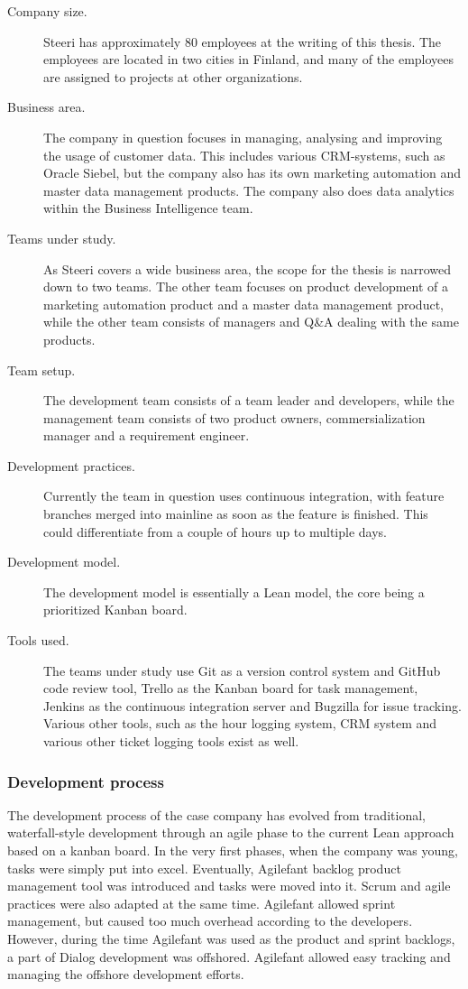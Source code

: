 \documentclass[english]{tktltiki2}
\theoremstyle{definition}
\theoremstyle{remark}
\begin{document}
\begin{description}
  \item[Company size.] Steeri has approximately 80 employees at the writing of this thesis. The employees are located in two cities in Finland, and many of the employees are assigned to projects at other organizations.
  \item[Business area.] The company in question focuses in managing, analysing and improving the usage of customer data. This includes various CRM-systems, such as Oracle Siebel, but the company also has its own marketing automation and master data management products. The company also does data analytics within the Business Intelligence team.
  \item[Teams under study.] As Steeri covers a wide business area, the scope for the thesis is narrowed down to two teams. The other team focuses on product development of a marketing automation product and a master data management product, while the other team consists of managers and Q\&A dealing with the same products.
  \item[Team setup.] The development team consists of a team leader and developers, while the management team consists of two product owners, commersialization manager and a requirement engineer. 
  \item[Development practices.] Currently the team in question uses continuous integration, with feature branches merged into mainline as soon as the feature is finished. This could differentiate from a couple of hours up to multiple days.
  \item[Development model.] The development model is essentially a Lean model, the core being a prioritized Kanban board.  
  \item[Tools used.] The teams under study use Git as a version control system and GitHub code review tool, Trello as the Kanban board for task management, Jenkins as the continuous integration server and Bugzilla for issue tracking. Various other tools, such as the hour logging system, CRM system and various other ticket logging tools exist as well.  
\end{description}

\subsubsection{Development process}
The development process of the case company has evolved from traditional, waterfall-style development through an agile phase to the current Lean approach based on a kanban board. In the very first phases, when the company was young, tasks were simply put into excel. Eventually, Agilefant backlog product management tool was introduced and tasks were moved into it. Scrum and agile practices were also adapted at the same time. Agilefant allowed sprint management, but caused too much overhead according to the developers. However, during the time Agilefant was used as the product and sprint backlogs, a part of Dialog development was offshored. Agilefant allowed easy tracking and managing the offshore development efforts.
\end{document}
